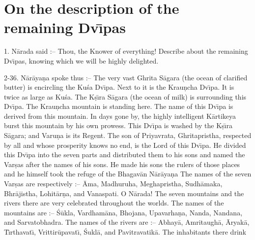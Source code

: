\chapter{On the description of the remaining Dv\={\i}pas}

1. N\=arada said :-- Thou, the Knower of everything! Describe about the remaining Dv\={\i}pas, knowing which we will be highly delighted.

2-36. N\=ar\=aya\d{n}a spoke thus :-- The very vast Ghrita S\=agara (the ocean of clarified butter) is encircling the Ku\'sa Dv\={\i}pa. Next to it is the Krau\d{n}cha Dv\={\i}pa. It is twice as large as Ku\'sa. The K\d{s}\={\i}ra S\=agara (the ocean of milk) is surrounding this Dv\={\i}pa. The Krau\d{n}cha mountain is standing here. The name of this Dv\={\i}pa is derived from this mountain. In days gone by, the highly intelligent K\=artikeya burst this mountain by his own prowess. This Dv\={\i}pa is washed by the K\d{s}\={\i}ra S\=agara; and Varu\d{n}a is its Regent. The son of Priyavrata, Ghritapristha, respected by all and whose prosperity knows no end, is the Lord of this Dv\={\i}pa. He divided this Dv\={\i}pa into the seven parts and distributed them to his sons and named the Var\d{s}as after the names of his sons. He made his sons the rulers of those places and he himself took the refuge of the Bhagav\=an N\=ar\=aya\d{n}a The names of the seven Var\d{s}as are respectively :-- \=Ama, Madhuruha, Meghapristha, Sudh\=amaka, Bhr\=ajistha, Lohit\=ar\d{n}a, and Vanaspati. O N\=arada! The seven mountains and the rivers there are very celebrated throughout the worlds. The names of the mountains are :-- \'S\=ukla, Vardham\=ana, Bhojana, Upavarha\d{n}a, Nanda, Nandana, and Sarvatobhadra. The names of the rivers are :-- Abhay\=a, Amritaugh\=a, \=Aryak\=a, T\={\i}rthavat\={\i}, Vrittir\=upavat\={\i}, \'Sukl\=a, and Pavitravatik\=a. The inhabitants there drink

